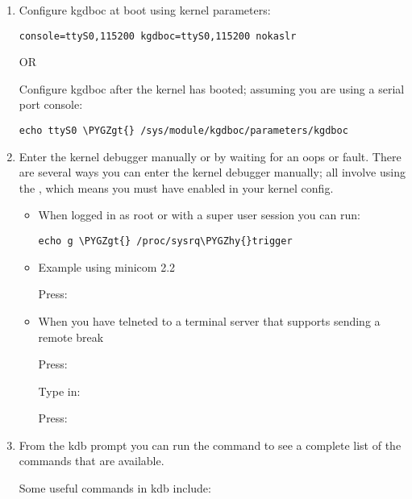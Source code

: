 \documentclass[a4paper,8pt,english]{sphinxmanual}
\def\PYGZgt{\char`\>}
\def\PYGZhy{\char`\-}
\begin{document}
\begin{enumerate}
\item {} 
Configure kgdboc at boot using kernel parameters:

\begin{Verbatim}[commandchars=\\\{\}]
console=ttyS0,115200 kgdboc=ttyS0,115200 nokaslr
\end{Verbatim}

OR

Configure kgdboc after the kernel has booted; assuming you are using
a serial port console:

\begin{Verbatim}[commandchars=\\\{\}]
echo ttyS0 \PYGZgt{} /sys/module/kgdboc/parameters/kgdboc
\end{Verbatim}

\item {} 
Enter the kernel debugger manually or by waiting for an oops or
fault. There are several ways you can enter the kernel debugger
manually; all involve using the , which means you must have
enabled  in your kernel config.
\begin{itemize}
\item {} 
When logged in as root or with a super user session you can run:

\begin{Verbatim}[commandchars=\\\{\}]
echo g \PYGZgt{} /proc/sysrq\PYGZhy{}trigger
\end{Verbatim}

\item {} 
Example using minicom 2.2

Press:   

\item {} 
When you have telneted to a terminal server that supports sending
a remote break

Press: \code{CTRL-{]}}

Type in: 

Press:  

\end{itemize}

\item {} 
From the kdb prompt you can run the  command to see a complete
list of the commands that are available.

Some useful commands in kdb include:


\end{enumerate}
\end{document}
